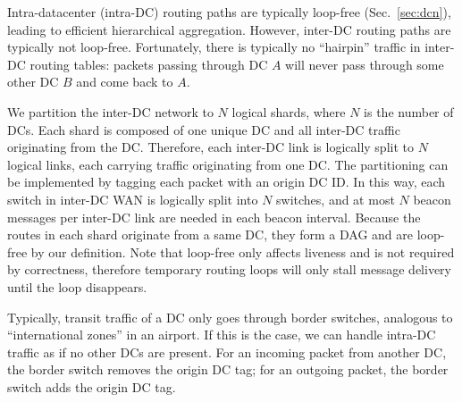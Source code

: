 Intra-datacenter (intra-DC) routing paths are typically loop-free (Sec.~\ref{sec:dcn}), leading to efficient hierarchical aggregation. However, inter-DC routing paths are typically not loop-free. Fortunately, there is typically no ``hairpin'' traffic in inter-DC routing tables: packets passing through DC $A$ will never pass through some other DC $B$ and come back to $A$.

We partition the inter-DC network to $N$ logical shards, where $N$ is the number of DCs. Each shard is composed of one unique DC and all inter-DC traffic originating from the DC. Therefore, each inter-DC link is logically split to $N$ logical links, each carrying traffic originating from one DC.
The partitioning can be implemented by tagging each packet with an origin DC ID.
In this way, each switch in inter-DC WAN is logically split into $N$ switches, and at most $N$ beacon messages per inter-DC link are needed in each beacon interval.
Because the routes in each shard originate from a same DC, they form a DAG and are loop-free by our definition.
Note that loop-free only affects liveness and is not required by correctness, therefore temporary routing loops will only stall message delivery until the loop disappears.

Typically, transit traffic of a DC only goes through border switches, analogous to ``international zones'' in an airport. If this is the case, we can handle intra-DC traffic as if no other DCs are present. For an incoming packet from another DC, the border switch removes the origin DC tag; for an outgoing packet, the border switch adds the origin DC tag.
\fi
